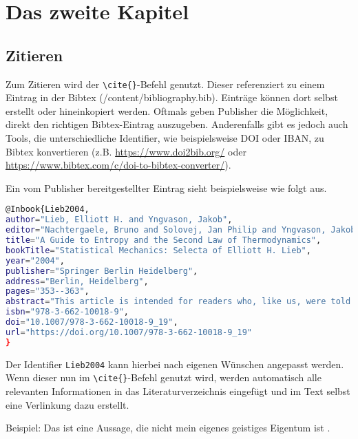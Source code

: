 \chapter{Das zweite Kapitel}

\section{Zitieren}
Zum Zitieren wird der \texttt{\textbackslash{}cite\{\}}-Befehl genutzt. Dieser referenziert zu einem Eintrag in der Bibtex (/content/bibliography.bib). Einträge können dort selbst erstellt oder hineinkopiert werden. Oftmals geben Publisher die Möglichkeit, direkt den richtigen Bibtex-Eintrag auszugeben. Anderenfalls gibt es jedoch auch Tools, die unterschiedliche Identifier, wie beispielsweise DOI oder IBAN, zu Bibtex konvertieren (z.B. \href{https://www.doi2bib.org/}{https://www.doi2bib.org/} oder \href{https://www.bibtex.com/c/doi-to-bibtex-converter/}{https://www.bibtex.com/c/doi-to-bibtex-converter/}).

Ein vom Publisher bereitgestellter Eintrag sieht beispielsweise wie folgt aus.
\begin{lstlisting}[caption=Beispiel eines Bibtex-Eintrags, label=lst:bibtex_def, language=bash]
@Inbook{Lieb2004,
author="Lieb, Elliott H. and Yngvason, Jakob",
editor="Nachtergaele, Bruno and Solovej, Jan Philip and Yngvason, Jakob",
title="A Guide to Entropy and the Second Law of Thermodynamics",
bookTitle="Statistical Mechanics: Selecta of Elliott H. Lieb",
year="2004",
publisher="Springer Berlin Heidelberg",
address="Berlin, Heidelberg",
pages="353--363",
abstract="This article is intended for readers who, like us, were told that the second law of thermodynamics is one of the major achievements of the nineteenth cenwry---that it is a logical, perfect, and unbreakable law---but who were unsatisfied with the ``derivations'' of the entropy principle as found in textbooks and in popular writings.",
isbn="978-3-662-10018-9",
doi="10.1007/978-3-662-10018-9_19",
url="https://doi.org/10.1007/978-3-662-10018-9_19"
}
\end{lstlisting}

Der Identifier \texttt{Lieb2004} kann hierbei nach eigenen Wünschen angepasst werden. Wenn dieser nun im \texttt{\textbackslash{}cite\{\}}-Befehl genutzt wird, werden automatisch alle relevanten Informationen in das Literaturverzeichnis eingefügt und im Text selbst eine Verlinkung dazu erstellt.

Beispiel: Das ist eine Aussage, die nicht mein eigenes geistiges Eigentum ist \cite{Lieb2004}.


